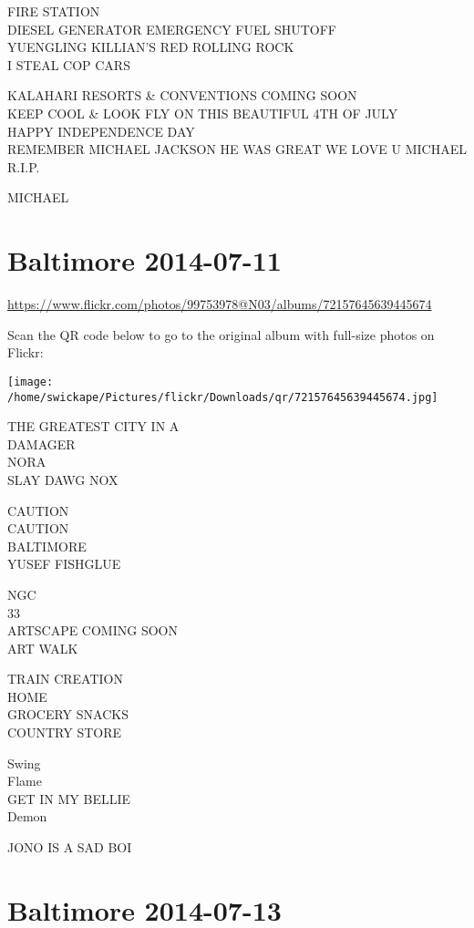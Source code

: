 \documentclass[10pt,letterpaper]{article}
\begin{document}
FIRE STATION\\
DIESEL GENERATOR EMERGENCY FUEL SHUTOFF\\
YUENGLING KILLIAN'S RED ROLLING ROCK\\
I STEAL COP CARS

KALAHARI RESORTS \& CONVENTIONS COMING SOON\\
KEEP COOL \& LOOK FLY ON THIS BEAUTIFUL 4TH OF JULY\\
HAPPY INDEPENDENCE DAY\\
REMEMBER MICHAEL JACKSON HE WAS GREAT WE LOVE U MICHAEL R.I.P.

MICHAEL


\section*{Baltimore 2014-07-11}

\url{https://www.flickr.com/photos/99753978@N03/albums/72157645639445674}

Scan the QR code below to go to the original album with full-size photos on Flickr:

\texttt{[image: /home/swickape/Pictures/flickr/Downloads/qr/72157645639445674.jpg]}


THE GREATEST CITY IN A\\
DAMAGER\\
NORA\\
SLAY DAWG NOX

CAUTION\\
CAUTION\\
BALTIMORE\\
YUSEF FISHGLUE

NGC\\
33\\
ARTSCAPE COMING SOON\\
ART WALK

TRAIN CREATION\\
HOME\\
GROCERY SNACKS\\
COUNTRY STORE

Swing\\
Flame\\
GET IN MY BELLIE\\
Demon

JONO IS A SAD BOI


\section*{Baltimore 2014-07-13}
\end{document}
